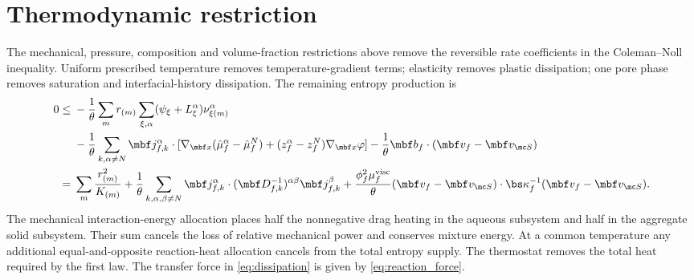 \documentclass[11pt]{article}
\begin{document}
\section{Thermodynamic restriction}
The mechanical, pressure, composition and volume-fraction restrictions above remove the reversible rate coefficients in the Coleman--Noll inequality. Uniform prescribed temperature removes temperature-gradient terms; elasticity removes plastic dissipation; one pore phase removes saturation and interfacial-history dissipation. The remaining entropy production is
\begin{align}
 0\le{}&-\frac1\theta\sum_mr_{(m)}
 \sum_{\xi,\alpha}(\psi_\xi+L_\xi^\alpha)\nu_{\xi(m)}^\alpha\notag\\
 &-\frac1\theta\sum_{k,\alpha\ne N}\mbf j_{f,k}^\alpha\cdot
 [\nabla_{\mbf x}(\hat\mu_f^\alpha-\hat\mu_f^N)
 +(z_f^\alpha-z_f^N)\nabla_{\mbf x}\varphi]
 -\frac1\theta\mbf b_f\cdot(\mbf v_f-\mbf v_{\mc S})\notag\\
 ={}&\sum_m\frac{r_{(m)}^2}{K_{(m)}}+
 \frac1\theta\sum_{k,\alpha,\beta\ne N}\mbf j_{f,k}^\alpha\cdot
 (\mbf D_{f,k}^{-1})^{\alpha\beta}\mbf j_{f,k}^\beta
 +\frac{\phi_f^2\mu_f^{\rm visc}}\theta
 (\mbf v_f-\mbf v_{\mc S})\cdot\bs\kappa_f^{-1}(\mbf v_f-\mbf v_{\mc S}).
 \label{eq:dissipation}
\end{align}
The mechanical interaction-energy allocation places half the nonnegative drag heating in the aqueous subsystem and half in the aggregate solid subsystem. Their sum cancels the loss of relative mechanical power and conserves mixture energy. At a common temperature any additional equal-and-opposite reaction-heat allocation cancels from the total entropy supply. The thermostat removes the total heat required by the first law. The transfer force in \eqref{eq:dissipation} is given by \eqref{eq:reaction_force}.
\end{document}
